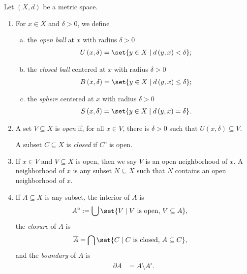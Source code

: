 \begin{definition}
  Let $\left(X,d\right)$ be a metric space.
  \begin{enumerate}[(1)]
    \item For $x\in X$ and $\delta > 0$, we define
      \begin{enumerate}[(a)]
        \item the \textit{open ball} at $x$ with radius $\delta > 0$
          \begin{align*}
            U\left(x,\delta\right) &= \set{y\in X\mid d\left(y,x\right) < \delta};
          \end{align*}
        \item the \textit{closed ball} centered at $x$ with radius $\delta > 0$
          \begin{align*}
            B\left(x,\delta\right) &= \set{y\in X\mid d\left(y,x\right)\leq \delta};
          \end{align*}
        \item the \textit{sphere} centered at $x$ with radius $\delta > 0$
          \begin{align*}
            S\left(x,\delta\right) &= \set{y\in X\mid d\left(y,x\right) = \delta}.
          \end{align*}
      \end{enumerate}
    \item A set $V\subseteq X$ is \textit{open} if, for all $x\in V$, there is $\delta > 0$ such that $U\left(x,\delta\right)\subseteq V$.\newline

      A subset $C\subseteq X$ is \textit{closed} if $C^{c}$ is open.
    \item If $x\in V$ and $V\subseteq X$ is open, then we say $V$ is an open neighborhood of $x$. A neighborhood of $x$ is any subset $N\subseteq X$ such that $N$ contains an open neighborhood of $x$.
    \item If $A\subseteq X$ is any subset, the interior of $A$ is
      \begin{align*}
        A^{\circ} &:= \bigcup\set{V\mid V\text{ is open, }V\subseteq A},
      \end{align*}
      the \textit{closure} of $A$ is
      \begin{align*}
        \overline{A} &= \bigcap\set{C\mid C\text{ is closed, }A\subseteq C},
      \end{align*}
      and the \textit{boundary} of $A$ is
      \begin{align*}
        \partial A &= \overline{A} \setminus A^{\circ}.
      \end{align*}
  \end{enumerate}
\end{definition}
